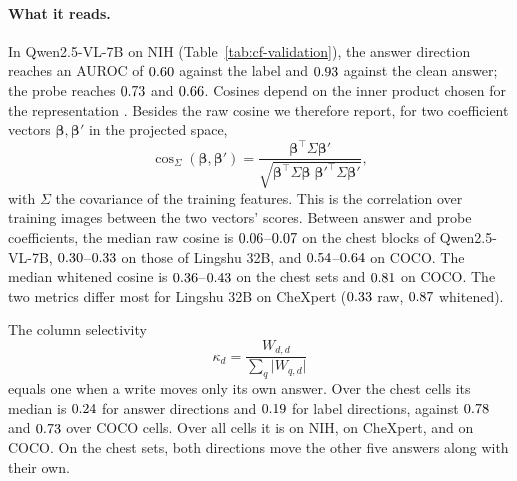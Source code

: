 \documentclass[11pt]{article}
\begin{document}
\paragraph{What it reads.} In Qwen2.5-VL-7B on NIH (Table~\ref{tab:cf-validation}), the answer direction reaches an AUROC of $0.60$ against the label and $0.93$ against the clean answer; the probe reaches $0.73$ and $0.66$. Cosines depend on the inner product chosen for the representation \citep{park2024linear}. Besides the raw cosine we therefore report, for two coefficient vectors $\boldsymbol\beta,\boldsymbol\beta'$ in the projected space,
\begin{equation}
\cos_\Sigma(\boldsymbol\beta,\boldsymbol\beta')=\frac{\boldsymbol\beta^{\top}\Sigma\boldsymbol\beta'}{\sqrt{\boldsymbol\beta^{\top}\Sigma\boldsymbol\beta\;\boldsymbol\beta'^{\top}\Sigma\boldsymbol\beta'}},
\label{eq:whitened-cos}
\end{equation}
with $\Sigma$ the covariance of the training features. This is the correlation over training images between the two vectors' scores. Between answer and probe coefficients, the median raw cosine is $0.06$--$0.07$ on the chest blocks of Qwen2.5-VL-7B, $0.30$--$0.33$ on those of Lingshu 32B, and $0.54$--$0.64$ on COCO. The median whitened cosine is $0.36$--$0.43$ on the chest sets and $0.81$ on COCO. The two metrics differ most for Lingshu 32B on CheXpert ($0.33$ raw, $0.87$ whitened).

The column selectivity
\begin{equation}
\kappa_d=\frac{W_{d,d}}{\sum_q\lvert W_{q,d}\rvert}
\label{eq:column-selectivity}
\end{equation}
equals one when a write moves only its own answer. Over the \cfAnsColSelChestN{} chest cells its median is $0.24$ for answer directions and $0.19$ for label directions, against $0.78$ and $0.73$ over \cfAnsColSelCocoN{} COCO cells. Over all cells it is \cfValColSelNih{} on NIH, \cfValColSelChex{} on CheXpert, and \cfValColSelCoco{} on COCO. On the chest sets, both directions move the other five answers along with their own.
\end{document}
